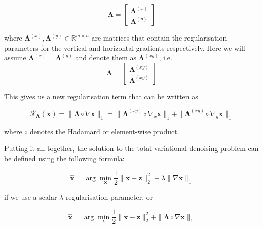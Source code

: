 \documentclass[12pt]{article}
\begin{document}
\begin{equation}
  \mathbf{\Lambda} = \begin{bmatrix}
    \mathbf{\Lambda}^{(x)} \\
    \mathbf{\Lambda}^{(y)}
  \end{bmatrix}
\end{equation}

where $\mathbf{\Lambda}^{(x)}, \mathbf{\Lambda}^{(y)} \in \mathbb{R}^{m \times n}$ are matrices that contain the regularisation parameters for the vertical and horizontal gradients respectively.
Here we will assume $\mathbf{\Lambda}^{(x)} = \mathbf{\Lambda}^{(y)}$ and denote them as $\mathbf{\Lambda}^{(xy)}$, i.e.
\begin{equation}
  \mathbf{\Lambda} = \begin{bmatrix}
    \mathbf{\Lambda}^{(xy)} \\
    \mathbf{\Lambda}^{(xy)}
  \end{bmatrix}
\end{equation}

This gives us a new regularisation term that can be written as

\begin{equation}
  \mathcal{R}_{\mathbf{\Lambda}}(\mathbf{x}) = \| \mathbf{\Lambda} \circ \nabla \mathbf{x} \|_1
  = \| \mathbf{\Lambda}^{(xy)} \circ \nabla_x \mathbf{x} \|_1 + \| \mathbf{\Lambda}^{(xy)} \circ \nabla_y \mathbf{x} \|_1
\end{equation}

where $\circ$ denotes the Hadamard or element-wise product.



Putting it all together,
the solution to the total variational denoising problem
can be 
defined
using the following formula:

\begin{equation}
  \hat{\mathbf{x}} = \arg \min_{\mathbf{x}} \frac{1}{2} \|\mathbf{x} - \mathbf{z}\|_2^2 + \lambda \| \nabla \mathbf{x} \|_1
\end{equation}

if we use a scalar $\lambda$ regularisation parameter, or

\begin{equation} \label{eq:minimisation_problem_lambda_map}
  \hat{\mathbf{x}} = \arg \min_{\mathbf{x}} \frac{1}{2} \|\mathbf{x} - \mathbf{z}\|_2^2 + \| \mathbf{\Lambda} \circ \nabla \mathbf{x} \|_1
\end{equation}
\end{document}
